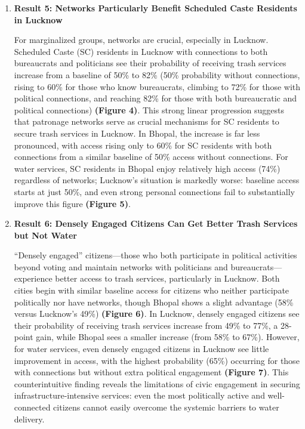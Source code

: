 \begin{enumerate}[left=0pt]
    \item \textbf{Result 5: Networks Particularly Benefit Scheduled Caste Residents in Lucknow}

    For marginalized groups, networks are crucial, especially in Lucknow. Scheduled Caste (SC) residents in Lucknow with connections to both bureaucrats and politicians see their probability of receiving trash services increase from a baseline of 50\% to 82\% (50\% probability without connections, rising to 60\% for those who know bureaucrats, climbing to 72\% for those with political connections, and reaching 82\% for those with both bureaucratic and political connections) \textbf{(Figure 4)}. This strong linear progression suggests that patronage networks serve as crucial mechanisms for SC residents to secure trash services in Lucknow. In Bhopal, the increase is far less pronounced, with access rising only to 60\% for SC residents with both connections from a similar baseline of 50\% access without connections. For water services, SC residents in Bhopal enjoy relatively high access (74\%) regardless of networks; Lucknow's situation is markedly worse: baseline access starts at just 50\%, and even strong personal connections fail to substantially improve this figure \textbf{(Figure 5)}.

    \item \textbf{Result 6: Densely Engaged Citizens Can Get Better Trash Services but Not Water}

    “Densely engaged” citizens—those who both participate in political activities beyond voting and maintain networks with politicians and bureaucrats—experience better access to trash services, particularly in Lucknow. Both cities begin with similar baseline access for citizens who neither participate politically nor have networks, though Bhopal shows a slight advantage (58\% versus Lucknow's 49\%) \textbf{(Figure 6)}. In Lucknow, densely engaged citizens see their probability of receiving trash services increase from 49\% to 77\%, a 28-point gain, while Bhopal sees a smaller increase (from 58\% to 67\%). However, for water services, even densely engaged citizens in Lucknow see little improvement in access, with the highest probability (65\%) occurring for those with connections but without extra political engagement \textbf{(Figure 7)}. This counterintuitive finding reveals the limitations of civic engagement in securing infrastructure-intensive services: even the most politically active and well-connected citizens cannot easily overcome the systemic barriers to water delivery.

\end{enumerate}


